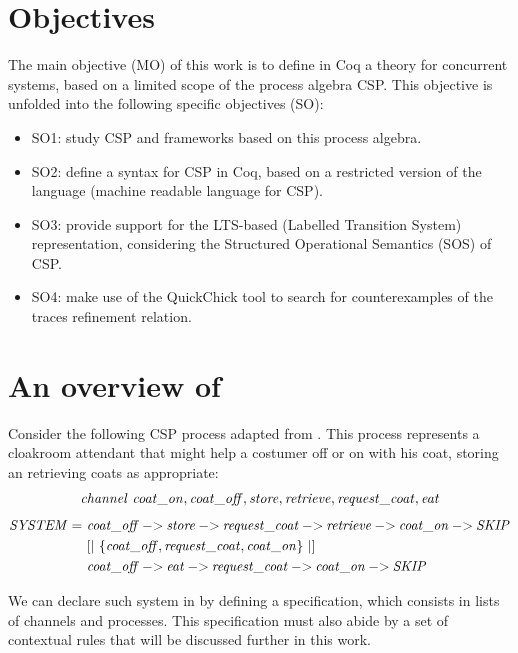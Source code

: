 \section{Objectives}

The main objective (MO) of this work is to define in Coq a theory for concurrent systems, based on a limited scope of the process algebra CSP. This objective is unfolded into the following specific objectives (SO):

\begin{itemize}
	\item SO1: study CSP and frameworks based on this process algebra.
	\item SO2: define a syntax for CSP in Coq, based on a restricted version of the \CSPM{} language (machine readable language for CSP).
	\item SO3: provide support for the LTS-based (Labelled Transition System) representation, considering the Structured Operational Semantics (SOS) of CSP.
	\item SO4: make use of the QuickChick tool to search for counterexamples of the traces refinement relation.
\end{itemize}

\section{An overview of \CSPcoq{}}


Consider the following CSP process adapted from . This process represents a cloakroom attendant that might help a costumer off or on with his coat, storing an retrieving coats as appropriate:
\begin{align}
	\mathit{channel\ coat\_on, coat\_off, store, retrieve, request\_coat, eat}\notag
\end{align}
\begin{align}
	\mathit{SYSTEM} =\ &\mathit{coat\_off \mathbin{{-}{>}} store \mathbin{{-}{>}} request\_coat \mathbin{{-}{>}} retrieve \mathbin{{-}{>}} coat\_on \mathbin{{-}{>}} SKIP}\notag\\
			 &[|\ \{\mathit{coat\_off, request\_coat, coat\_on}\}\ |]\notag\\
	  		 &\mathit{coat\_off \mathbin{{-}{>}} eat \mathbin{{-}{>}} request\_coat \mathbin{{-}{>}} coat\_on \mathbin{{-}{>}} SKIP}\notag
\end{align}

We can declare such system in \CSPcoq{} by defining a specification, which consists in lists of channels and processes. This specification must also abide by a set of contextual rules that will be discussed further in this work.

